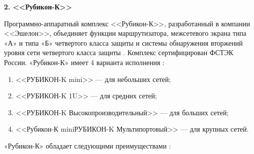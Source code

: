 \begin{center}
	\textbf{\Large 2. <<Рубикон-К>>}
\end{center}

Программно-аппаратный комплекс <<Рубикон-К>>, разработанный в компании <<Эшелон>>, объединяет функции маршрутизатора, межсетевого экрана типа «А» и типа «Б» четвертого класса защиты и системы обнаружения вторжений уровня сети четвертого класса защиты \cite{rubicon}. Комплекс сертифицирован ФСТЭК России. «Рубикон-К» имеет 4 варианта исполнения \cite{rubicon}:
\begin{enumerate}
	\item <<РУБИКОН-K mini>> --- для небольших сетей;
	
	\item <<РУБИКОН-K 1U>> --- для средних сетей;
		
	\item <<РУБИКОН-K Высокопроизводительный>> --- для больших сетей;
			
	\item <<Рубикон-К miniРУБИКОН-K Мультипортовый>> --- для крупных сетей.
\end{enumerate}
	
\noindent «Рубикон-К» обладает следующими преимуществами \cite{rubicon}:

